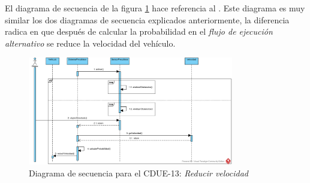 \par El diagrama de secuencia de la figura \ref{img:reducir_velocidad} hace referencia al . Este diagrama es muy similar los dos diagramas de secuencia explicados anteriormente, la diferencia radica en que después de calcular la probabilidad en el \textit{flujo de ejecución alternativo} se reduce la velocidad del vehículo.

\begin{figure}[h]
  \begin{center}
    \includegraphics[width=0.8\textwidth]{./img/diagramas_de_secuencia/CDUE-13.png}
  \end{center}
  \caption{Diagrama de secuencia para el CDUE-13: \textit{Reducir velocidad}}
  \label{img:reducir_velocidad}
\end{figure}
